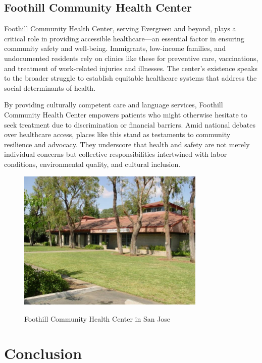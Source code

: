 \documentclass[12pt]{article}
\begin{document}
\subsection{Foothill Community Health Center}

Foothill Community Health Center, serving Evergreen and beyond, plays a critical role in providing accessible healthcare—an essential factor in ensuring community safety and well-being. Immigrants, low-income families, and undocumented residents rely on clinics like these for preventive care, vaccinations, and treatment of work-related injuries and illnesses. The center’s existence speaks to the broader struggle to establish equitable healthcare systems that address the social determinants of health.

By providing culturally competent care and language services, Foothill Community Health Center empowers patients who might otherwise hesitate to seek treatment due to discrimination or financial barriers. Amid national debates over healthcare access, places like this stand as testaments to community resilience and advocacy. They underscore that health and safety are not merely individual concerns but collective responsibilities intertwined with labor conditions, environmental quality, and cultural inclusion.

\begin{figure}[h]
  \centering
  \includegraphics[width=0.8\textwidth]{assets/foothill_center.png}
  \caption{Foothill Community Health Center in San Jose}
  \label{fig:foothill_center}
  \cite{a2017foothill}
\end{figure}

\section{Conclusion}
\end{document}
